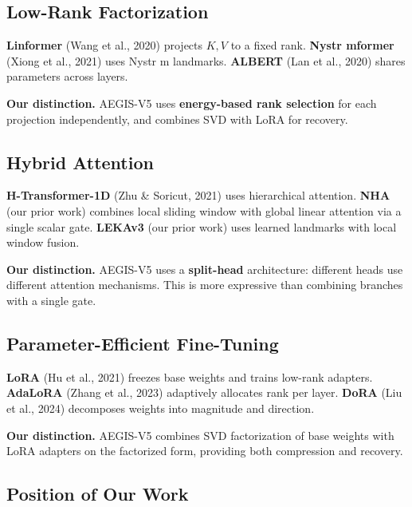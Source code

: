 \subsection{Low-Rank Factorization}

\textbf{Linformer} (Wang et al., 2020) projects $K, V$ to a fixed rank. 
\textbf{Nystr mformer} (Xiong et al., 2021) uses Nystr m landmarks. \textbf{ALBERT} 
(Lan et al., 2020) shares parameters across layers.

\textbf{Our distinction.} AEGIS-V5 uses \textbf{energy-based rank selection} for each 
projection independently, and combines SVD with LoRA for recovery.

\subsection{Hybrid Attention}

\textbf{H-Transformer-1D} (Zhu \& Soricut, 2021) uses hierarchical attention. 
\textbf{NHA} (our prior work) combines local sliding window with global linear 
attention via a single scalar gate. \textbf{LEKAv3} (our prior work) uses 
learned landmarks with local window fusion.

\textbf{Our distinction.} AEGIS-V5 uses a \textbf{split-head} architecture: different 
heads use different attention mechanisms. This is more expressive than 
combining branches with a single gate.

\subsection{Parameter-Efficient Fine-Tuning}

\textbf{LoRA} (Hu et al., 2021) freezes base weights and trains low-rank 
adapters. \textbf{AdaLoRA} (Zhang et al., 2023) adaptively allocates rank per 
layer. \textbf{DoRA} (Liu et al., 2024) decomposes weights into magnitude and 
direction.

\textbf{Our distinction.} AEGIS-V5 combines SVD factorization of base weights 
with LoRA adapters on the factorized form, providing both compression and 
recovery.

\subsection{Position of Our Work}

